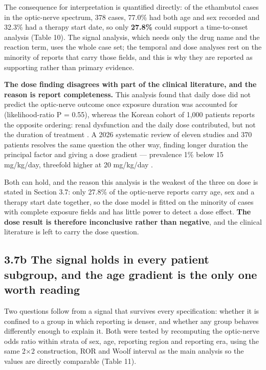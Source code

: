 \documentclass[utf8]{FrontiersinVancouver}
\begin{document}
The consequence for interpretation is quantified directly: of the ethambutol cases in the optic-nerve spectrum, 378 cases, 77.0\% had both age and sex recorded and 32.3\% had a therapy start date, so only \textbf{27.8\%} could support a time-to-onset analysis (Table 10). The signal analysis, which needs only the drug name and the reaction term, uses the whole case set; the temporal and dose analyses rest on the minority of reports that carry those fields, and this is why they are reported as supporting rather than primary evidence.

\textbf{The dose finding disagrees with part of the clinical literature, and the reason is report completeness.} This analysis found that daily dose did not predict the optic-nerve outcome once exposure duration was accounted for (likelihood-ratio P = 0.55), whereas the Korean cohort of 1,000 patients reports the opposite ordering: renal dysfunction and the daily dose contributed, but not the duration of treatment \citep{l2008}. A 2026 systematic review of eleven studies and 370 patients resolves the same question the other way, finding longer duration the principal factor and giving a dose gradient --- prevalence 1\% below 15 mg/kg/day, threefold higher at 20 mg/kg/day \citep{c2026}.

Both can hold, and the reason this analysis is the weakest of the three on dose is stated in Section 3.7: only 27.8\% of the optic-nerve reports carry age, sex and a therapy start date together, so the dose model is fitted on the minority of cases with complete exposure fields and has little power to detect a dose effect. \textbf{The dose result is therefore inconclusive rather than negative}, and the clinical literature is left to carry the dose question.

\subsection{3.7b The signal holds in every patient subgroup, and the age gradient is the only one worth reading}

Two questions follow from a signal that survives every specification: whether it is confined to a group in which reporting is denser, and whether any group behaves differently enough to explain it. Both were tested by recomputing the optic-nerve odds ratio within strata of sex, age, reporting region and reporting era, using the same 2$\times$2 construction, ROR and Woolf interval as the main analysis so the values are directly comparable (Table 11).
\end{document}
